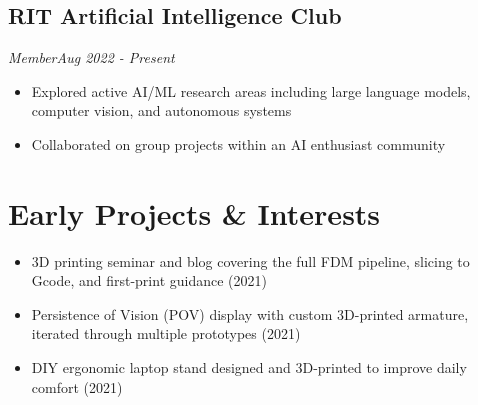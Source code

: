\documentclass[11pt]{article}
\newenvironment{bullets}{
  \begin{itemize}[leftmargin=*,nosep,topsep=0.08em,itemsep=0.02em]
}{
  \end{itemize}
}
\begin{document}
\subsection{RIT Artificial Intelligence Club}
\textit{Member}\hfill\textit{Aug 2022 - Present}\par
\begin{bullets}
  \item Explored active AI/ML research areas including large language models, computer vision, and autonomous systems
  \item Collaborated on group projects within an AI enthusiast community
\end{bullets}

\section{Early Projects \& Interests}
\begin{bullets}
  \item 3D printing seminar and blog covering the full FDM pipeline, slicing to Gcode, and first-print guidance (2021)
  \item Persistence of Vision (POV) display with custom 3D-printed armature, iterated through multiple prototypes (2021)
  \item DIY ergonomic laptop stand designed and 3D-printed to improve daily comfort (2021)
\end{bullets}
\end{document}
